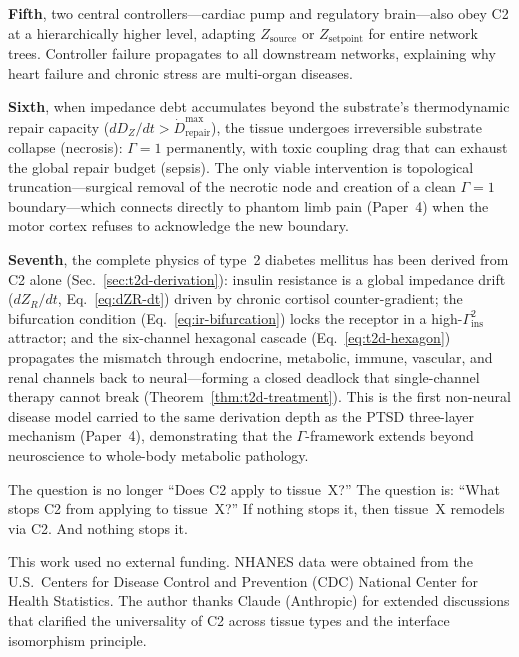 \documentclass[aps,pre,twocolumn,superscriptaddress,floatfix]{revtex4-2}
\begin{document}
\textbf{Fifth}, two central controllers---cardiac pump
and regulatory brain---also obey C2 at a hierarchically
higher level, adapting $Z_{\text{source}}$ or
$Z_{\text{setpoint}}$ for entire network trees.
Controller failure propagates to all downstream networks,
explaining why heart failure and chronic stress are
multi-organ diseases.

\textbf{Sixth}, when impedance debt accumulates beyond
the substrate's thermodynamic repair capacity
($dD_Z/dt > \dot{D}_{\text{repair}}^{\max}$),
the tissue undergoes irreversible substrate collapse
(necrosis): $\Gamma = 1$ permanently, with toxic
coupling drag that can exhaust the global repair budget
(sepsis).
The only viable intervention is topological
truncation---surgical removal of the necrotic node
and creation of a clean $\Gamma = 1$ boundary---which
connects directly to phantom limb pain (Paper~4)
when the motor cortex refuses to acknowledge the
new boundary.

\textbf{Seventh}, the complete physics of type~2
diabetes mellitus has been derived from C2 alone
(Sec.~\ref{sec:t2d-derivation}): insulin resistance
is a global impedance drift
($dZ_R/dt$, Eq.~\ref{eq:dZR-dt}) driven by
chronic cortisol counter-gradient;
the bifurcation condition
(Eq.~\ref{eq:ir-bifurcation}) locks the receptor
in a high-$\Gamma_{\text{ins}}^2$ attractor;
and the six-channel hexagonal cascade
(Eq.~\ref{eq:t2d-hexagon}) propagates the mismatch
through endocrine, metabolic, immune, vascular,
and renal channels back to neural---forming a
closed deadlock that single-channel therapy
cannot break
(Theorem~\ref{thm:t2d-treatment}).
This is the first non-neural disease model
carried to the same derivation depth as the
PTSD three-layer mechanism (Paper~4),
demonstrating that the $\Gamma$-framework
extends beyond neuroscience to whole-body
metabolic pathology.

The question is no longer ``Does C2 apply to tissue~X?''
The question is: ``What stops C2 from applying to
tissue~X?''  If nothing stops it, then tissue~X
remodels via C2.  And nothing stops it.


\begin{acknowledgments}
This work used no external funding.
NHANES data were obtained from the U.S.\ Centers for
Disease Control and Prevention (CDC) National Center
for Health Statistics.
The author thanks Claude (Anthropic) for extended
discussions that clarified the universality of C2
across tissue types and the interface isomorphism
principle.
\end{acknowledgments}
\end{document}
